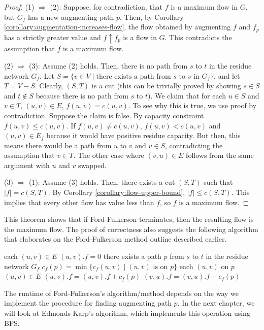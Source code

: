 \begin{proof}
    \hfill

    (1) $\Rightarrow$ (2): Suppose, for contradiction, that $f$ is a maximum flow in $G$, but $G_f$ has a new augmenting path $p$. Then, by Corollary \ref{corollary:augmentation-increases-flow}, the flow obtained by augmenting $f$ and $f_p$ has a strictly greater value and $f \uparrow f_p$ is a flow in $G$. This contradicts the assumption that $f$ is a maximum flow. 

    (2) $\Rightarrow$ (3): Assume (2) holds. Then, there is no path from $s$ to $t$ in the residue network $G_f$. Let $S = \{ v \in V \mid \text{there exists a path from $s$ to $v$ in $G_f$} \}$, and let $T = V-S$. Clearly, $(S,T)$ is a cut (this can be trivially proved by showing $s \in S$ and $t \not\in S$ because there is no path from $s$ to $t$). We claim that for each $u\in S$ and $v \in T$, $(u,v) \in E$, $f(u,v) = c(u,v)$. To see why this is true, we use proof by contradiction. Suppose the claim is false. By capacity constraint $f(u,v) \leq c(u,v)$. If $f(u,v) \neq c(u,v)$, $f(u,v) < c(u,v)$ and $(u,v) \in E_f$ because it would have positive residue capacity. But then, this means there would be a path from $u$ to $v$ and $v \in S$, contradicting the assumption that $v \in T$. The other case where $(v,u) \in E$ follows from the same argument with $u$ and $v$ swapped.

    (3) $\Rightarrow$ (1): Assume (3) holds. Then, there exists a cut $(S,T)$ such that $|f| = c(S,T)$. By Corollary \ref{corollary:flow-upper-bound}, $|f| \leq c(S,T)$. This implies that every other flow has value less than $f$, so $f$ is a maximum flow.
\end{proof}

This theorem shows that if Ford-Fulkerson terminates, then the resulting flow is the maximum flow. The proof of correctness also suggests the following algorithm that elaborates on the Ford-Fulkerson method outline described earlier.

\begin{codebox}
    \li \For each $(u,v) \in E$ \Do
        \li $(u,v).f = 0$ 
    \End
    \li \While there exists a path $p$ from $s$ to $t$ in the residue network $G_f$ \Do
        \li $c_f(p) = \min \{c_f(u,v) \mid \text{$(u,v)$ is on $p$} \}$ 
        \li \For each $(u,v)$ on $p$ \Do {}
            \li \If $(u,v) \in E$ \Then
                \li $(u,v).f = (u,v).f + c_f(p)$
            \li \Else $(v,u).f = (v,u).f - c_f(p)$
            \End
        \End
    \End
\end{codebox}

The runtime of Ford-Fulkerson's algorithm/method depends on the way we implement the procedure for finding augmenting path $p$. In the next chapter, we will look at Edmonds-Karp's algorithm, which implements this operation using BFS.